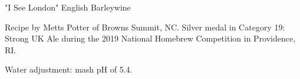 \stylesection{\styleenglishbarleywine}

\begin{recipe}{"I See London" English Barleywine}

\begin{aboutblock}
Recipe by Metts Potter of Browns Summit, NC. Silver medal in Category 19:
Strong UK Ale during the 2019 National Homebrew Competition in Providence,
RI. \sourceaha
\end{aboutblock}


\begin{methodandtiming}
 
\begin{mashsteps}
\end{mashsteps}

\begin{fermentationsteps}
\end{fermentationsteps}

\begin{directions}
Water adjustment: mash pH of 5.4.
\end{directions}

\end{methodandtiming}

\recipebreak

\begin{ingredientsblock}

\begin{malts}
\end{malts}

\begin{hops}
\end{hops}


\end{ingredientsblock}

\end{recipe}

